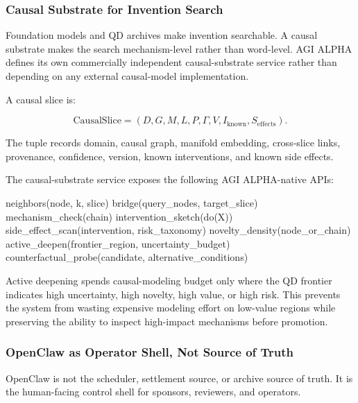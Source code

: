 \documentclass[
  11pt,
]{article}
\newenvironment{Shaded}{}{}
\newcommand{\NormalTok}[1]{#1}
\begin{document}
\subsubsection{Causal Substrate for Invention
Search}\label{causal-substrate-for-invention-search}

Foundation models and QD archives make invention searchable. A causal
substrate makes the search mechanism-level rather than word-level. AGI
ALPHA defines its own commercially independent causal-substrate service
rather than depending on any external causal-model implementation.

A causal slice is:

\[
\mathrm{CausalSlice}=(D,G,M,L,P,\Gamma,V,I_{\mathrm{known}},S_{\mathrm{effects}}).
\]

The tuple records domain, causal graph, manifold embedding, cross-slice
links, provenance, confidence, version, known interventions, and known
side effects.

The causal-substrate service exposes the following AGI ALPHA-native
APIs:

\begin{Shaded}
\begin{Highlighting}[]
\NormalTok{neighbors(node, k, slice)}
\NormalTok{bridge(query\_nodes, target\_slice)}
\NormalTok{mechanism\_check(chain)}
\NormalTok{intervention\_sketch(do(X))}
\NormalTok{side\_effect\_scan(intervention, risk\_taxonomy)}
\NormalTok{novelty\_density(node\_or\_chain)}
\NormalTok{active\_deepen(frontier\_region, uncertainty\_budget)}
\NormalTok{counterfactual\_probe(candidate, alternative\_conditions)}
\end{Highlighting}
\end{Shaded}

Active deepening spends causal-modeling budget only where the QD
frontier indicates high uncertainty, high novelty, high value, or high
risk. This prevents the system from wasting expensive modeling effort on
low-value regions while preserving the ability to inspect high-impact
mechanisms before promotion.

\subsubsection{OpenClaw as Operator Shell, Not Source of
Truth}\label{openclaw-as-operator-shell-not-source-of-truth}

OpenClaw is not the scheduler, settlement source, or archive source of
truth. It is the human-facing control shell for sponsors, reviewers, and
operators.
\end{document}
